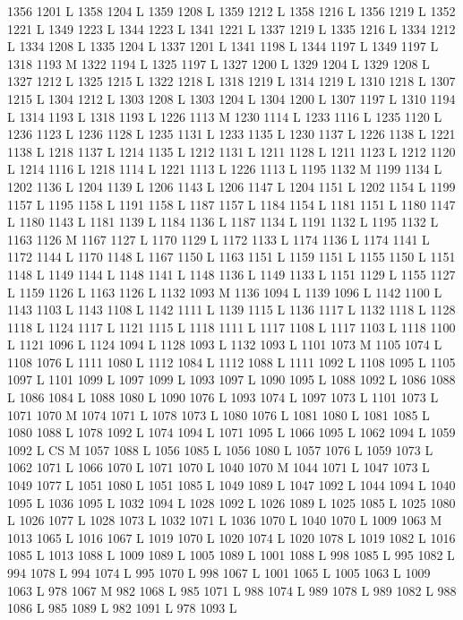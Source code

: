 {{{{{{{{{{{{{{{{{{{{{{{{{{{{{{1356 1201 L
1358 1204 L
1359 1208 L
1359 1212 L
1358 1216 L
1356 1219 L
1352 1221 L
1349 1223 L
1344 1223 L
1341 1221 L
1337 1219 L
1335 1216 L
1334 1212 L
1334 1208 L
1335 1204 L
1337 1201 L
1341 1198 L
1344 1197 L
1349 1197 L
1318 1193 M 1322 1194 L
1325 1197 L
1327 1200 L
1329 1204 L
1329 1208 L
1327 1212 L
1325 1215 L
1322 1218 L
1318 1219 L
1314 1219 L
1310 1218 L
1307 1215 L
1304 1212 L
1303 1208 L
1303 1204 L
1304 1200 L
1307 1197 L
1310 1194 L
1314 1193 L
1318 1193 L
1226 1113 M 1230 1114 L
1233 1116 L
1235 1120 L
1236 1123 L
1236 1128 L
1235 1131 L
1233 1135 L
1230 1137 L
1226 1138 L
1221 1138 L
1218 1137 L
1214 1135 L
1212 1131 L
1211 1128 L
1211 1123 L
1212 1120 L
1214 1116 L
1218 1114 L
1221 1113 L
1226 1113 L
1195 1132 M 1199 1134 L
1202 1136 L
1204 1139 L
1206 1143 L
1206 1147 L
1204 1151 L
1202 1154 L
1199 1157 L
1195 1158 L
1191 1158 L
1187 1157 L
1184 1154 L
1181 1151 L
1180 1147 L
1180 1143 L
1181 1139 L
1184 1136 L
1187 1134 L
1191 1132 L
1195 1132 L
1163 1126 M 1167 1127 L
1170 1129 L
1172 1133 L
1174 1136 L
1174 1141 L
1172 1144 L
1170 1148 L
1167 1150 L
1163 1151 L
1159 1151 L
1155 1150 L
1151 1148 L
1149 1144 L
1148 1141 L
1148 1136 L
1149 1133 L
1151 1129 L
1155 1127 L
1159 1126 L
1163 1126 L
1132 1093 M 1136 1094 L
1139 1096 L
1142 1100 L
1143 1103 L
1143 1108 L
1142 1111 L
1139 1115 L
1136 1117 L
1132 1118 L
1128 1118 L
1124 1117 L
1121 1115 L
1118 1111 L
1117 1108 L
1117 1103 L
1118 1100 L
1121 1096 L
1124 1094 L
1128 1093 L
1132 1093 L
1101 1073 M 1105 1074 L
1108 1076 L
1111 1080 L
1112 1084 L
1112 1088 L
1111 1092 L
1108 1095 L
1105 1097 L
1101 1099 L
1097 1099 L
1093 1097 L
1090 1095 L
1088 1092 L
1086 1088 L
1086 1084 L
1088 1080 L
1090 1076 L
1093 1074 L
1097 1073 L
1101 1073 L
1071 1070 M 1074 1071 L
1078 1073 L
1080 1076 L
1081 1080 L
1081 1085 L
1080 1088 L
1078 1092 L
1074 1094 L
1071 1095 L
1066 1095 L
1062 1094 L
1059 1092 L
CS M
1057 1088 L
1056 1085 L
1056 1080 L
1057 1076 L
1059 1073 L
1062 1071 L
1066 1070 L
1071 1070 L
1040 1070 M 1044 1071 L
1047 1073 L
1049 1077 L
1051 1080 L
1051 1085 L
1049 1089 L
1047 1092 L
1044 1094 L
1040 1095 L
1036 1095 L
1032 1094 L
1028 1092 L
1026 1089 L
1025 1085 L
1025 1080 L
1026 1077 L
1028 1073 L
1032 1071 L
1036 1070 L
1040 1070 L
1009 1063 M 1013 1065 L
1016 1067 L
1019 1070 L
1020 1074 L
1020 1078 L
1019 1082 L
1016 1085 L
1013 1088 L
1009 1089 L
1005 1089 L
1001 1088 L
998 1085 L
995 1082 L
994 1078 L
994 1074 L
995 1070 L
998 1067 L
1001 1065 L
1005 1063 L
1009 1063 L
978 1067 M 982 1068 L
985 1071 L
988 1074 L
989 1078 L
989 1082 L
988 1086 L
985 1089 L
982 1091 L
978 1093 L
}}}}}}}}}}}}}}}}}}}}}}}}}}}}}}
